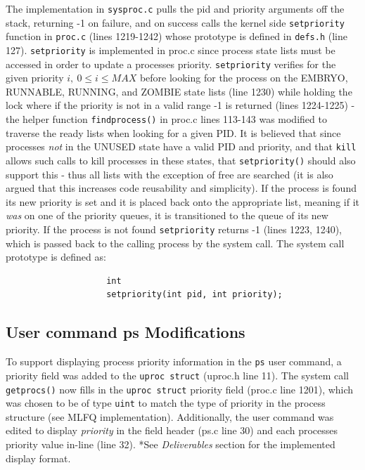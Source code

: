 \documentclass[11pt,letterpaper]{report}
\begin{document}
\begin{itemize}
	The implementation in {\tt sysproc.c} pulls the pid and priority arguments off the stack, returning -1 on failure, and on success calls the kernel side {\tt setpriority} 
	function in {\tt proc.c} (lines 1219-1242) whose prototype is defined in {\tt defs.h} (line 127). {\tt setpriority} is implemented in proc.c since process state lists must
	be accessed in order to update a processes priority. {\tt setpriority} verifies for the given priority $i, \  0 \leq i \leq MAX$ before
	looking for the process on the EMBRYO, RUNNABLE, RUNNING, and ZOMBIE state lists (line 1230) while holding the lock where if the priority is not in a valid range -1 is returned (lines 1224-1225) 
	- the helper function {\tt findprocess()} in proc.c lines 113-143 was modified to traverse the ready lists when looking for a given PID. 
	It is believed that since processes \emph{not} in the UNUSED state have a valid PID and priority, and that {\tt kill} allows such calls to kill processes in these states, that {\tt setpriority()}
	should also support this - thus all lists with the exception of free are searched (it is also argued that this increases code reusability and simplicity). If the process is found its new 
	priority is set and it is placed back onto the appropriate list, meaning if it \emph{was} on one of the priority queues, it is transitioned to the queue of its new priority. If the process is 
	not found {\tt setpriority} returns -1 (lines 1223, 1240), which is passed back to the calling process by the system call. The system call prototype is defined as:
				\begin{verbatim}
					int
					setpriority(int pid, int priority);
				\end{verbatim}
	
	
	
	\subsection*{User command ps Modifications}
	To support displaying process priority information in the {\tt ps} user command, a priority field was added to the {\tt uproc struct} (uproc.h line 11). The system call {\tt getprocs()} 
	now fills in the {\tt uproc struct} priority field (proc.c line 1201), which was chosen to be of type {\tt uint} to match the type of priority in the process structure (see MLFQ implementation). Additionally, the user command was edited to display \emph{priority} in the field header (ps.c line 30) and each processes priority value in-line (line 32). *See \emph{Deliverables} section for the implemented display format.
	

\end{itemize}
\end{document}
